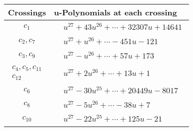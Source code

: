 \documentclass[1p]{elsarticle_modified}
\theoremstyle{definition}
\begin{document}
\begin{tabular}{m{50pt}|m{274pt}}
Crossings & \hspace{64pt}u-Polynomials at each crossing \\
\hline $$\begin{aligned}c_{1}\end{aligned}$$&$\begin{aligned}
&u^{27}+43 u^{26}+\cdots+32307 u+14641
\end{aligned}$\\
\hline $$\begin{aligned}c_{2},c_{7}\end{aligned}$$&$\begin{aligned}
&u^{27}+u^{26}+\cdots-451 u-121
\end{aligned}$\\
\hline $$\begin{aligned}c_{3},c_{9}\end{aligned}$$&$\begin{aligned}
&u^{27}- u^{26}+\cdots+57 u+173
\end{aligned}$\\
\hline $$\begin{aligned}c_{4},c_{5},c_{11}\\c_{12}\end{aligned}$$&$\begin{aligned}
&u^{27}+2 u^{26}+\cdots+13 u+1
\end{aligned}$\\
\hline $$\begin{aligned}c_{6}\end{aligned}$$&$\begin{aligned}
&u^{27}-30 u^{25}+\cdots+20449 u-8017
\end{aligned}$\\
\hline $$\begin{aligned}c_{8}\end{aligned}$$&$\begin{aligned}
&u^{27}-5 u^{26}+\cdots-38 u+7
\end{aligned}$\\
\hline $$\begin{aligned}c_{10}\end{aligned}$$&$\begin{aligned}
&u^{27}-22 u^{25}+\cdots+125 u-21
\end{aligned}$\\
\hline
\end{tabular}\\~\\
\end{document}
